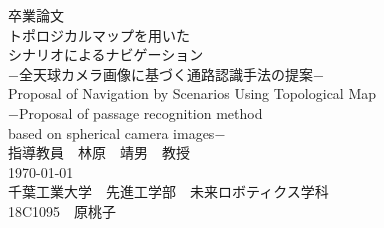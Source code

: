 \documentclass[../main]{subfiles}
\begin{document}
  \begin{titlepage}
    \begin{center}
      {\huge  卒業論文}\\
      \vspace{1.5cm}
      {\huge トポロジカルマップを用いた\\シナリオによるナビゲーション\\
      \vspace{1cm}
      −全天球カメラ画像に基づく通路認識手法の提案−}\\
      \vspace{0.5cm}
     {\huge Proposal of Navigation by Scenarios Using Topological Map\\
     −Proposal of passage recognition method \\based on spherical camera images−}\\
      \vspace{1cm}
      {\LARGE 指導教員　林原　靖男　教授}\\
      \vspace{2cm}
      {\LARGE \today}\\
      \vspace{1cm}
      {\LARGE 千葉工業大学　先進工学部　未来ロボティクス学科}\\
      \vspace{1cm}
      {\LARGE 18C1095　原桃子}\\
    \end{center}
  \end{titlepage}
\end{document}
